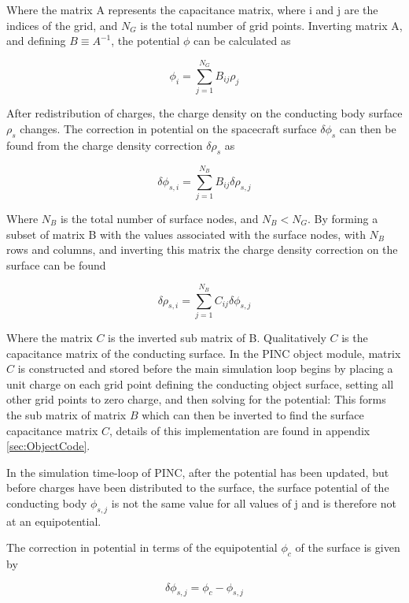 Where the matrix A represents the capacitance matrix, where i and j are the indices of the grid, and $N_G$ is the total number of grid points. Inverting matrix A, and defining $B \equiv A^{-1}$, the potential $\phi$ can be calculated as 

\begin{equation}
    \phi_i = \sum^{N_G}_{j=1} B_{ij} \rho_j
\end{equation}


After redistribution of charges, the charge density on the conducting body surface $\rho_s$ changes. The correction in potential on the spacecraft surface $\delta \phi_s$ can then be found from the charge density correction $\delta \rho_s$ as

\begin{equation}
    \delta \phi_{s,i} = \sum^{N_B}_{j=1} B_{ij} \delta \rho_{s,j}
\end{equation}

Where $N_B$ is the total number of surface nodes, and $N_B < N_G$. By forming a subset of matrix B with the values associated with the surface nodes, with $N_B$ rows and columns, and inverting this matrix the charge density correction on the surface can be found

\begin{equation}\label{eq:SCchargeCorr}
    \delta \rho_{s,i} = \sum^{N_B}_{j=1} C_{ij} \delta \phi_{s,j}
\end{equation}

Where the matrix $C$ is the inverted sub matrix of B. Qualitatively $C$ is the capacitance matrix of the conducting surface. In the PINC object module, matrix $C$ is constructed and stored before the main simulation loop begins by placing a unit charge on each grid point defining the conducting object surface, setting all other grid points to zero charge, and then solving for the potential: This forms the sub matrix of matrix $B$ which can then be inverted to find the surface capacitance matrix $C$, details of this implementation are found in appendix \ref{sec:ObjectCode}.

In the simulation time-loop of PINC, after the potential has been updated, but before charges have been distributed to the surface, the surface potential of the conducting body $\phi_{s,j}$ is not the same value for all values of j and is therefore not at an equipotential. 

The correction in potential in terms of the equipotential $\phi_c$ of the surface is given by

\begin{equation}\label{eq:SCphiCorrEqui}
    \delta \phi_{s,j} = \phi_c - \phi_{s,j}
\end{equation}

